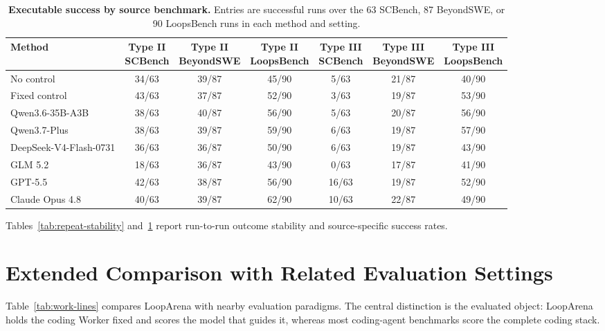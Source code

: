 \begin{table}[H]
\caption{\textbf{Executable success by source benchmark.} Entries are successful runs over the 63 SCBench, 87 BeyondSWE, or 90 LoopsBench runs in each method and setting.}
\label{tab:executable-source-results}
\centering
\footnotesize
\setlength{\tabcolsep}{3.5pt}
\begin{tabular}{@{}lcccccc@{}}
\toprule
Method & \shortstack{Type II\\SCBench} & \shortstack{Type II\\BeyondSWE} & \shortstack{Type II\\LoopsBench} & \shortstack{Type III\\SCBench} & \shortstack{Type III\\BeyondSWE} & \shortstack{Type III\\LoopsBench} \\
\midrule
No control & 34/63 & 39/87 & 45/90 & 5/63 & 21/87 & 40/90 \\
Fixed control & 43/63 & 37/87 & 52/90 & 3/63 & 19/87 & 53/90 \\
Qwen3.6-35B-A3B & 38/63 & 40/87 & 56/90 & 5/63 & 20/87 & 56/90 \\
Qwen3.7-Plus & 38/63 & 39/87 & 59/90 & 6/63 & 19/87 & 57/90 \\
DeepSeek-V4-Flash-0731 & 36/63 & 36/87 & 50/90 & 6/63 & 19/87 & 43/90 \\
GLM 5.2 & 18/63 & 36/87 & 43/90 & 0/63 & 17/87 & 41/90 \\
GPT-5.5 & 42/63 & 38/87 & 56/90 & 16/63 & 19/87 & 52/90 \\
Claude Opus 4.8 & 40/63 & 39/87 & 62/90 & 10/63 & 22/87 & 49/90 \\
\bottomrule
\end{tabular}
\end{table}

Tables~\ref{tab:repeat-stability} and~\ref{tab:executable-source-results} report run-to-run outcome stability and source-specific success rates.

\section{Extended Comparison with Related Evaluation Settings}
\label{app:positioning}

Table~\ref{tab:work-lines} compares LoopArena with nearby evaluation paradigms. The central distinction is the evaluated object: LoopArena holds the coding Worker fixed and scores the model that guides it, whereas most coding-agent benchmarks score the complete coding stack.

